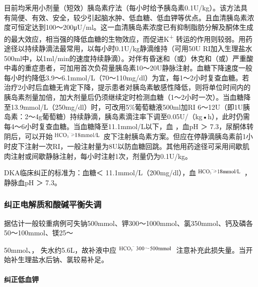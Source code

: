 目前均釆用小剂量（短效）胰岛素疗法（每小时给予胰岛素0.1U/kg）。该方法具有简便、有效、安全，较少引起脑水肿、低血糖、低血钾等优点。且血清胰岛素浓度可恒定达到100～200μU/ml。这一血清胰岛素浓度已有抑制脂肪分解及酮体生成的最大效应，相当强的降低血糖的生物效应，而促进K\textsuperscript{+}
转运的作用则较弱。用药途径以持续静滴法最常用，以每小时0.1U/kg静滴维持（可用50U
RI加入生理盐水500ml中，以1ml/min的速度持续静滴）。对伴有昏迷和（或）休克和（或）严重酸中毒的重症患者，可加用首次负荷量胰岛素10～20U静脉注射。血糖下降速度一般每小时约降低3.9～6.1mmol/L（70～110mg/dl）为宜，每1～2小时复查血糖。若治疗2小时后血糖无肯定下降，提示患者对胰岛素敏感性降低，则将单位时间内的胰岛素剂量加倍，加大剂量后仍须继续定时检测血糖（1～2小时一次）。当血糖降至13.9mmol/L（250mg/dl）时，可改用5\%葡萄糖液500ml加RI
6～12U（即1U胰岛素：2～4g葡萄糖）持续静滴，胰岛素滴注率下调至0.05U/（kg•h），此时仍需每4～6小时复查血糖。当血糖降至11.1mmol/L以下，血
，血pH ＞
7.3，尿酮体转阴后，可以开始\includegraphics[width=1.02083in,height=0.16667in]{./images/Image00166.jpg}
皮下注射胰岛素方案。但应在停静滴胰岛素前1小时皮下注射一次RI，一般注射量为8U以防血糖回跳。其他用药途径可采用间歇肌肉注射或间歇静脉注射，每小时注射1次，剂量仍为0.1U/kg。

DKA临床纠正的标准为：血糖＜
11.1mmol/L（200mg/dl），血\includegraphics[width=0.96875in,height=0.15625in]{./images/Image00167.jpg}
，静脉血pH ＞ 7.3。

\subsubsection{纠正电解质和酸碱平衡失调}

据估计一般较重病例可失钠500mmol、钾300～1000mmol、氯350mmol、钙及磷各50～100mmol、镁25～

50mmol、，
失水约5.6L，故补液中应\includegraphics[width=1.20833in,height=0.16667in]{./images/Image00168.jpg}
注意补充此损失量。当开始补生理盐水后钠、氯较易补足。

\paragraph{纠正低血钾}

